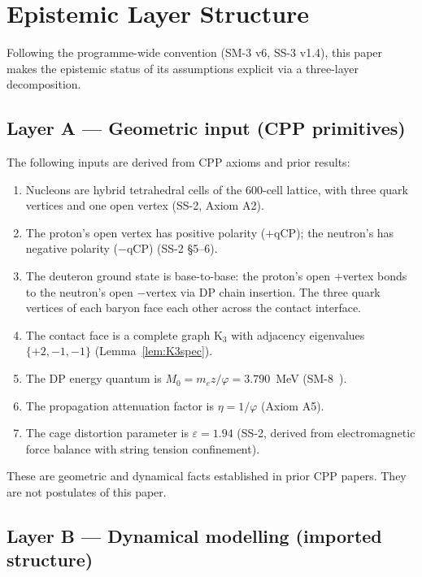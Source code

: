 \documentclass[11pt,letterpaper]{article}
\newcommand{\phig}{\varphi}
\newcommand{\Kthree}{\mathrm{K}_3}
\newcommand{\Mzero}{M_0}
\newcommand{\epscage}{\varepsilon}
\begin{document}
\section{Epistemic Layer Structure}
\label{sec:layers}

Following the programme-wide convention (SM-3 v6, SS-3 v1.4),
this paper makes the epistemic status of its assumptions
explicit via a three-layer decomposition.

\subsection{Layer A --- Geometric input (CPP primitives)}

The following inputs are derived from CPP axioms and prior
results:
\begin{enumerate}[label=(A\arabic*)]
\item Nucleons are hybrid tetrahedral cells of the 600-cell
  lattice, with three quark vertices and one open vertex
  (SS-2, Axiom A2).
\item The proton's open vertex has positive polarity
  ($+\mathrm{qCP}$); the neutron's has negative polarity
  ($-\mathrm{qCP}$) (SS-2 \S5--6).
\item The deuteron ground state is base-to-base: the proton's
  open $+$vertex bonds to the neutron's open $-$vertex via
  DP chain insertion.  The three quark vertices of each baryon
  face each other across the contact interface.
\item The contact face is a complete graph $\Kthree$ with
  adjacency eigenvalues $\{+2, -1, -1\}$
  (Lemma~\ref{lem:K3spec}).
\item The DP energy quantum is $\Mzero = m_e z/\phig = 3.790$~MeV
  (SM-8~\citep{abshier2026sm8}).
\item The propagation attenuation factor is $\eta = 1/\phig$
  (Axiom A5).
\item The cage distortion parameter is
  $\epscage = 1.94$ (SS-2, derived from electromagnetic
  force balance with string tension confinement).
\end{enumerate}
These are geometric and dynamical facts established in prior
CPP papers.  They are not postulates of this paper.

\subsection{Layer B --- Dynamical modelling (imported structure)}
\label{sec:layerb}
\end{document}
